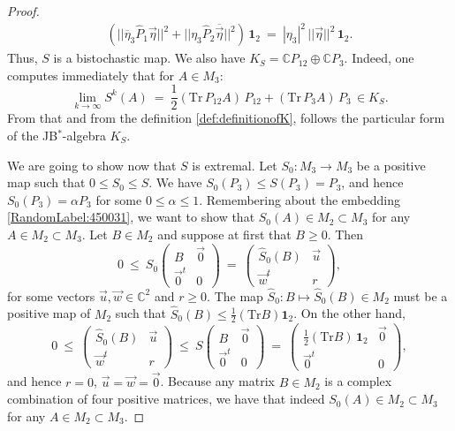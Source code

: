 \documentclass[12pt]{article}
\theoremstyle{plain}
\theoremstyle{definition}
\theoremstyle{remark}
\numberwithin{equation}{section}
\begin{document}
\begin{proof}
\begin{multline}
\left( || \overline{\eta}_{3} \hat{P}_{1} \vec{\eta} ||^{2} +
    || \eta_{3} \hat{P}_{2} \overline{\vec{\eta}} ||^{2} \right) \, \mathbf{1}_{2} 
    \: = \:
|\eta_{3}|^{2} \, ||\vec{\eta}||^{2} \, \mathbf{1}_{2}.
\end{multline}
Thus, $S$ is a bistochastic map.
We also have
$K_{S}= \mathbb{C} P_{12} \oplus \mathbb{C} P_{3}$.
Indeed,
one computes immediately that for $A \in M_{3}$:
\begin{equation}
\lim \limits_{k \rightarrow \infty} S^{k}(A) \:=\:
\frac{1}{2} (\text{Tr} \, P_{12} A )\, P_{12} +
    (\text{Tr} \, P_{3} A)\, P_{3} \, \in K_{S}.
\end{equation}
From that and from the definition \eqref{def:definitionofK},
follows the particular form of the JB$^{*}$-algebra $K_{S}$.

We are going to show now that $S$ is extremal.
Let $S_{0}: M_{3} \rightarrow M_{3}$ be a positive map such that
$0 \leq S_{0} \leq S$.
We have $S_{0}(P_{3}) \leq S(P_{3}) = P_{3}$,
and hence $S_{0}(P_{3}) = \alpha P_{3}$ for some $0 \leq \alpha \leq 1$.
Remembering about the embedding \eqref{RandomLabel:450031},
we want to show that $S_{0}(A) \in M_{2} \! \subset \! M_{3}$
for any $A \in M_{2} \! \subset \! M_{3}$.
Let $B \in M_{2}$ and suppose at first that $B \geq 0$.
Then
\begin{equation}
\label{eq:SMapsM2intoM2}
 0 \:\leq\: S_{0} \begin{pmatrix}
               B & \vec{0} \\ \vec{0}^{t} & 0
              \end{pmatrix} \: = \:
 \begin{pmatrix}
  \hat{S}_{0}(B) & \vec{u} \\ \vec{w}^{t} & r
 \end{pmatrix},
\end{equation}
for some vectors $\vec{u}, \vec{w} \in \mathbb{C}^{2}$ and $r \geq 0$.
The map $\hat{S}_{0}:B \mapsto \hat{S}_{0}(B) \in M_{2}$ must be a positive
map of $M_{2}$ such that $\hat{S}_{0}(B) \leq \frac{1}{2} (\text{Tr} B) \mathbf{1}_{2}$.
On the other hand,
\begin{equation}
 0 \: \leq \:
 \begin{pmatrix}
  \hat{S}_{0}(B) & \vec{u} \\ \vec{w}^{t} & r
 \end{pmatrix} \: \leq \:
            S \begin{pmatrix}
               B & \vec{0} \\ \vec{0}^{t} & 0
              \end{pmatrix} \: = \:
 \begin{pmatrix}
  \frac{1}{2} (\text{Tr} B) \, \mathbf{1}_{2} & \vec{0} \\ \vec{0}^{t} & 0
 \end{pmatrix},
\end{equation}
and hence $r=0$, $\vec{u}=\vec{w}=\vec{0}$.
Because any matrix $B \in M_{2}$ is a complex combination of four positive
matrices, we have that indeed $S_{0}(A) \in M_{2} \! \subset \! M_{3}$
for any $A \in M_{2} \! \subset \! M_{3}$.



\end{proof}
\end{document}
